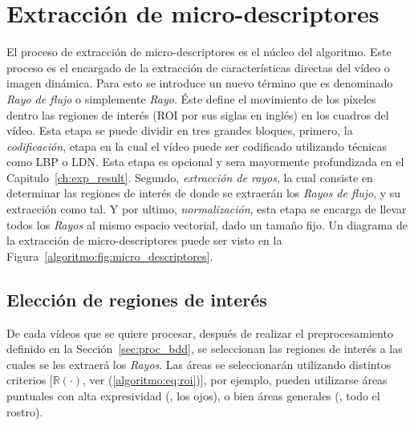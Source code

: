 \section{Extracción de micro-descriptores}
\label{sec:micro_descriptores}
	El proceso de extracción de micro-descriptores es el núcleo del algoritmo. Este proceso es el encargado de la extracción de características directas del vídeo o imagen dinámica. Para esto se introduce un nuevo término que es denominado \textit{Rayo de flujo} o simplemente \textit{Rayo}. Éste define el movimiento de los píxeles dentro las regiones de interés (ROI por sus siglas en inglés) en los cuadros del vídeo. Esta etapa se puede dividir en tres grandes bloques, primero, la \emph{codificación}, etapa en la cual el vídeo puede ser codificado utilizando técnicas como LBP o LDN\@. Esta etapa es opcional y sera mayormente profundizada en el Capitulo~\ref{ch:exp_result}. Segundo, \emph{extracción de rayos}, la cual consiste en determinar las regiones de interés de donde se extraerán los \textit{Rayos de flujo}, y su extracción como tal. Y por ultimo, \emph{normalización}, esta etapa se encarga de llevar todos los \textit{Rayos} al mismo espacio vectorial, dado un tamaño fijo. Un diagrama de la extracción de micro-descriptores puede ser visto en la Figura~\ref{algoritmo:fig:micro_descriptores}.


	\subsection{Elección de regiones de interés}
	\label{algoritmo:elecc_roi}
	De cada vídeos que se quiere procesar, después de realizar el preprocesamiento definido en la Sección~\ref{sec:proc_bdd}, se seleccionan las regiones de interés a las cuales se les extraerá los \textit{Rayos}. Las áreas se seleccionarán utilizando distintos criterios [$\mathds{R}(\cdot)$, ver (\ref{algoritmo:eq:roi})], por ejemplo, pueden utilizarse áreas puntuales con alta expresividad (\eg, los ojos), o bien áreas generales (\eg, todo el rostro).
	
